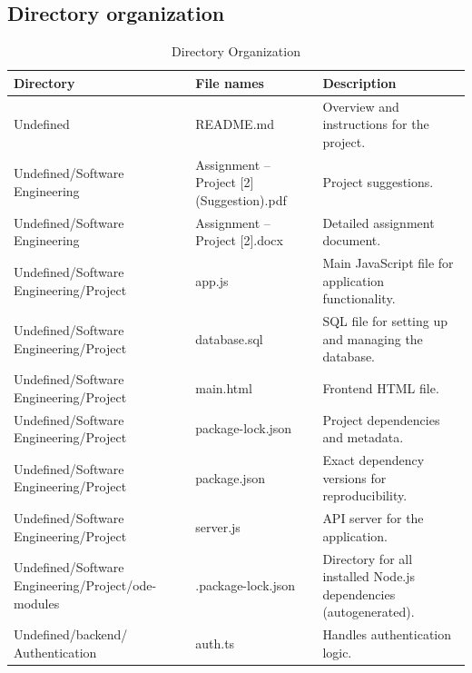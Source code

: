 \documentclass[conference]{IEEEtran}
\begin{document}
\subsection{Directory organization}
\begin{table}[H]
    \centering
    \caption{Directory Organization}
    \begin{adjustbox}{max width=\textwidth}
        \begin{tabular}{|>{\centering\arraybackslash}p{2.8cm}|>{\centering\arraybackslash}p{1.5cm}|p{3.5cm}|}
            \hline
            \textbf{ Directory } & \textbf{ File names } & \textbf{ Description } \\
            \hline
            Undefined  & README.md  & Overview and instructions for the project.  \\
            \hline
            Undefined/Software Engineering  & Assignment – Project [2] (Suggestion).pdf  & Project suggestions.  \\
            \hline
            Undefined/Software Engineering  & Assignment – Project [2].docx  & Detailed assignment document.  \\
            \hline
            Undefined/Software Engineering/Project  & app.js  & Main JavaScript file for application functionality.  \\
            \hline
            Undefined/Software Engineering/Project  & database.sql  & SQL file for setting up and managing the database.   \\
            \hline
            Undefined/Software Engineering/Project  & main.html  & Frontend HTML file.   \\
            \hline
             Undefined/Software Engineering/Project  & package-lock.json  & Project dependencies and metadata.   \\
            \hline
             Undefined/Software Engineering/Project  & package.json  & Exact dependency versions for reproducibility.   \\
            \hline
             Undefined/Software Engineering/Project  & server.js  & API server for the application.\\
            \hline
             Undefined/Software Engineering/Project/ode-modules  & .package-lock.json  & Directory for all installed Node.js dependencies (autogenerated). \\
            \hline
             Undefined/backend/
             Authentication  & auth.ts  & Handles authentication logic.   \\
            \hline

\end{tabular}
\end{adjustbox}
\end{table}
\end{document}
